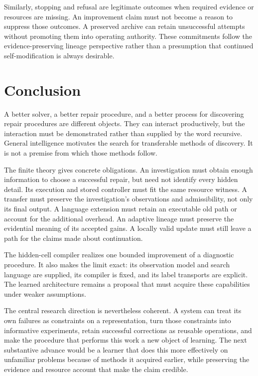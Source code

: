 \documentclass[11pt,letterpaper]{article}
\theoremstyle{plain}
\theoremstyle{definition}
\begin{document}
Similarly, stopping and refusal are legitimate outcomes when required evidence or resources are missing. An improvement claim must not become a reason to suppress those outcomes. A preserved archive can retain unsuccessful attempts without promoting them into operating authority. These commitments follow the evidence-preserving lineage perspective rather than a presumption that continued self-modification is always desirable.

\section{Conclusion}\label{sec:conclusion}
A better solver, a better repair procedure, and a better process for discovering repair procedures are different objects. They can interact productively, but the interaction must be demonstrated rather than supplied by the word recursive. General intelligence motivates the search for transferable methods of discovery. It is not a premise from which those methods follow.

The finite theory gives concrete obligations. An investigation must obtain enough information to choose a successful repair, but need not identify every hidden detail. Its execution and stored controller must fit the same resource witness. A transfer must preserve the investigation's observations and admissibility, not only its final output. A language extension must retain an executable old path or account for the additional overhead. An adaptive lineage must preserve the evidential meaning of its accepted gains. A locally valid update must still leave a path for the claims made about continuation.

The hidden-cell compiler realizes one bounded improvement of a diagnostic procedure. It also makes the limit exact: its observation model and search language are supplied, its compiler is fixed, and its label transports are explicit. The learned architecture remains a proposal that must acquire these capabilities under weaker assumptions.

The central research direction is nevertheless coherent. A system can treat its own failures as constraints on a representation, turn those constraints into informative experiments, retain successful corrections as reusable operations, and make the procedure that performs this work a new object of learning. The next substantive advance would be a learner that does this more effectively on unfamiliar problems because of methods it acquired earlier, while preserving the evidence and resource account that make the claim credible.
\end{document}
